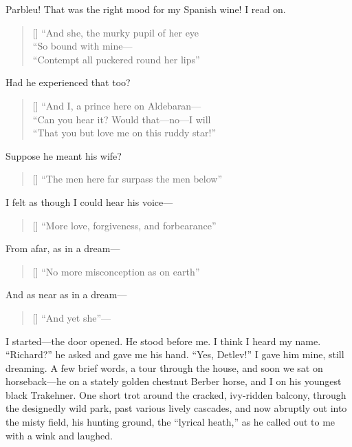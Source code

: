 \documentclass[12pt,a4paper]{article}
\begin{document}
Parbleu! That was the right mood for my Spanish wine! I read on.
\settowidth{\versewidth}{“Contempt all puckered round her lips”}
\begin{verse}[\versewidth]
“And she, the murky pupil of her eye \\
“So bound with mine— \\
“Contempt all puckered round her lips”
\end{verse}
Had he experienced that too?
\settowidth{\versewidth}{“That you but love me on this ruddy star!”}
\begin{verse}[\versewidth]
“And I, a prince here on Aldebaran— \\
“Can you hear it? Would that—no—I will \\
“That you but love me on this ruddy star!”
\end{verse}
Suppose he meant his wife?
\settowidth{\versewidth}{“The men here far surpass the men below”}
\begin{verse}[\versewidth]
“The men here far surpass the men below”
\end{verse}
I felt as though I could hear his voice—
\settowidth{\versewidth}{“More love, forgiveness, and forbearance”}
\begin{verse}[\versewidth]
“More love, forgiveness, and forbearance”
\end{verse}
From afar, as in a dream—
\settowidth{\versewidth}{“No more misconception as on earth”}
\begin{verse}[\versewidth]
“No more misconception as on earth”
\end{verse}
And as near as in a dream—
\settowidth{\versewidth}{“And yet she”—}
\begin{verse}[\versewidth]
“And yet she”—
\end{verse}
I started—the door opened. He stood before me. I think I heard my name. “Richard?” he asked and gave me his hand. “Yes, Detlev!” I gave him mine, still dreaming. A few brief words, a tour through the house, and soon we sat on horseback—he on a stately golden chestnut Berber horse, and I on his youngest black Trakehner. One short trot around the cracked, ivy-ridden balcony, through the designedly wild park, past various lively cascades, and now abruptly out into the misty field, his hunting ground, the “lyrical heath,” as he called out to me with a wink and laughed.
\end{document}
